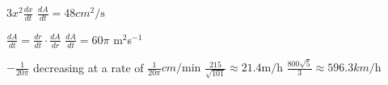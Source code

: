 \begin{Answer}[ref={exRelatedRates}]
	\Question %
	$3 x^{2} \frac{d x}{d t}$
\Question %
$\frac{d A}{d t} =48 cm^{2}/\mbox{s}$ 
\Question 
\begin{tasks}
	\task  %
	$ \frac{dA}{dt} =\frac{dr}{dt}\cdot \frac{dA}{dr}$
	\task  %
	$\frac{d A}{d t} =60 \pi$ m$^2$s$^{-1}$
\end{tasks}

\Question %
$ -\frac{1}{20 \pi }$ decreasing at a rate of $\frac{1}{20 \pi } cm/\mbox{min}$ 
\Question %
$\frac{215}{\sqrt{101}} \approx 21.4 \mathrm{m}/\mbox{h}$ 
\Question %
$\frac{800 \sqrt{5}}{3} \approx 596.3 km/\mbox{h}$	
\end{Answer}%

